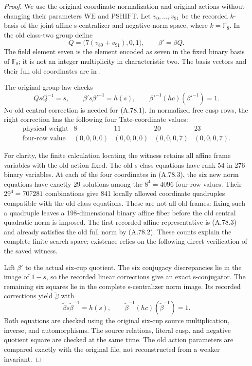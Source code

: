 \begin{proof}
We use the original coordinate normalization and original actions
without changing their parameters \(\mathrm{WE}\) and
\(\mathrm{PSHIFT}\). Let \(v_0,\ldots,v_{91}\) be the recorded
\(k\)-basis of the joint affine s-centralizer and negative-norm
space, where \(k=\mathbb F_8\). In the old class-two group define
\[
             Q=\bigl(7(v_{89}+v_{91}),0,1\bigr),
             \qquad \beta'=\beta Q.
 \tag{A.78.1}
\]
The field element seven is the element encoded as seven in the
fixed binary basis of \(\mathbb F_8\); it is not an integer
multiplicity in characteristic two. The basis vectors and their
full old coordinates are in
.

The original group law checks
\[
 QsQ^{-1}=s,\qquad
 \beta's\beta'^{-1}=h(s),\qquad
 \beta'^{-1}(hc)(\beta'^{-1})=1.
 \tag{A.78.2}
\]
No old central correction is needed for (A.78.1). In normalized
free cusp rows, the right correction has the following four
Tate-coordinate values:
\[
\begin{array}{c|cccc}
 \text{physical weight}&8&11&20&23\\ \hline
 \text{four-row value}&(0,0,0,0)&(0,0,0,0)&(0,0,0,7)&(0,0,0,7).
\end{array}
 \tag{A.78.3}
\]

For clarity, the finite calculation locating the witness retains
all affine frame variables with the old action fixed. The old
s-class equations have rank 54 in 276 binary variables. At each
of the four coordinates in (A.78.3), the six new norm equations
have exactly 29 solutions among the \(8^4=4096\) four-row values.
Their \(29^4=707281\) combinations give 841 locally allowed
coordinate quadruples compatible with the old class equations.
These are not all old frames: fixing such a quadruple leaves
a 198-dimensional binary affine fiber before the old central
quadratic norm is imposed. The first recorded affine representative
is (A.78.3) and already satisfies
the old full norm by (A.78.2). These counts explain the complete
finite search space; existence relies on the following direct
verification of the saved witness.

Lift \(\beta'\) to the actual six-cup quotient. The six
conjugacy discrepancies lie in the image of \(1-s\), so the
recorded linear corrections give an exact s-conjugator. The
remaining six squares lie in the complete s-centralizer norm
image. Its recorded corrections yield \(\widetilde\beta\) with
\[
 \widetilde\beta s\widetilde\beta^{-1}=h(s),\qquad
 \widetilde\beta^{-1}(hc)(\widetilde\beta^{-1})=1.
 \tag{A.78.4}
\]
Both equations are checked using the original six-cup source
multiplication, inverse, and automorphisms. The source relations,
literal cusp, and negative quotient square are checked at the
same time. The old action parameters are compared exactly with
the original file, not reconstructed from a weaker invariant.


\end{proof}
